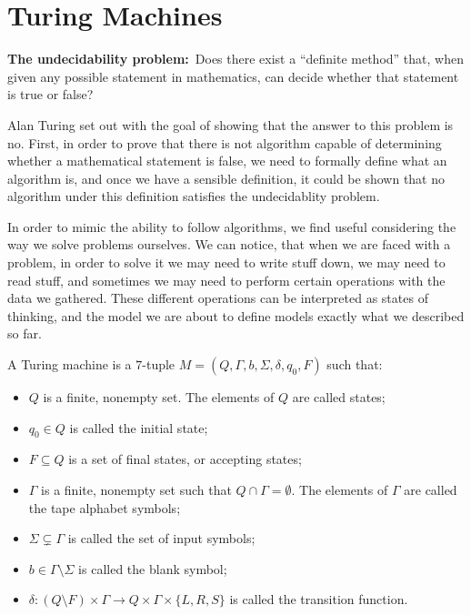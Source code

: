 \documentclass[11pt,a4paper]{article}
\begin{document}
	\maketitle


  \newpage
  \tableofcontents
	\newpage

  \section{Turing Machines}
  \textbf{The undecidability problem:}\
  Does there exist a ``definite method'' that, 
  when given any possible statement in mathematics, 
  can decide whether that statement is true or false?

  Alan Turing set out with the goal of showing that the answer to this
  problem is no.
  First, in order to prove that there is not algorithm capable of determining
  whether a mathematical statement is false, we need to formally define
  what an algorithm is, and once we have a sensible definition, it could
  be shown that no algorithm under this definition satisfies the
  undecidablity problem.

  In order to mimic the ability to follow algorithms, we find useful
  considering the way we solve problems ourselves.
  We can notice, that when we are faced with a problem, in order to solve
  it we may need to write stuff down, we may need to read stuff, and
  sometimes we may need to perform certain operations with the data
  we gathered. These different operations can be interpreted as states
  of thinking, and the model we are about to define models exactly what
  we described so far.

  \begin{definition}
    A Turing machine is a $7$-tuple 
    $M = (Q,\Gamma,b,\Sigma,\delta,q_{0},F)$
    such that:
    \begin{itemize}
      \item $Q$ is a finite, nonempty set.
        The elements of $Q$ are called states;
      \item $q_0 \in Q$ is called the initial state;
      \item $F \subseteq Q$ is a set of final states, or accepting states;
      \item $\Gamma$ is a finite, nonempty set such that 
        $Q \cap \Gamma = \emptyset$. The elements of $\Gamma$ are called
        the tape alphabet symbols;
      \item $\Sigma \subsetneq \Gamma$ is called the set of input symbols;
      \item $b \in \Gamma \setminus \Sigma$ is called the blank symbol;
      \item $\delta \colon (Q \setminus F) \times \Gamma \to 
        Q \times \Gamma \times \{L, R, S\}$ is called the transition 
        function.
      \end{itemize}
  \end{definition}
\end{document}
